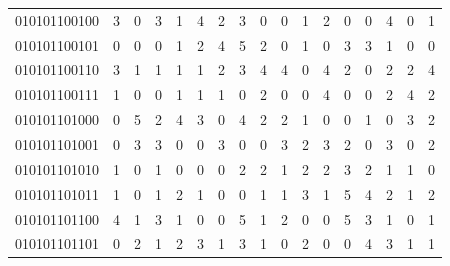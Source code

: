 \documentclass[10pt,a4paper]{article}
\begin{document}
\begin{longtable}{ |c|c|c|c|c|c|c|c|c|c|c|c|c|c|c|c|c| }
    010101100100              & 3                            & 0                                & 3                            & 1                              & 4   & 2   & 3   & 0   & 0   & 1   & 2   & 0   & 0   & 4   & 0   & 1   \\
    010101100101              & 0                            & 0                                & 0                            & 1                              & 2   & 4   & 5   & 2   & 0   & 1   & 0   & 3   & 3   & 1   & 0   & 0   \\
    010101100110              & 3                            & 1                                & 1                            & 1                              & 1   & 2   & 3   & 4   & 4   & 0   & 4   & 2   & 0   & 2   & 2   & 4   \\
    010101100111              & 1                            & 0                                & 0                            & 1                              & 1   & 1   & 0   & 2   & 0   & 0   & 4   & 0   & 0   & 2   & 4   & 2   \\
    010101101000              & 0                            & 5                                & 2                            & 4                              & 3   & 0   & 4   & 2   & 2   & 1   & 0   & 0   & 1   & 0   & 3   & 2   \\
    010101101001              & 0                            & 3                                & 3                            & 0                              & 0   & 3   & 0   & 0   & 3   & 2   & 3   & 2   & 0   & 3   & 0   & 2   \\
    010101101010              & 1                            & 0                                & 1                            & 0                              & 0   & 0   & 2   & 2   & 1   & 2   & 2   & 3   & 2   & 1   & 1   & 0   \\
    010101101011              & 1                            & 0                                & 1                            & 2                              & 1   & 0   & 0   & 1   & 1   & 3   & 1   & 5   & 4   & 2   & 1   & 2   \\
    010101101100              & 4                            & 1                                & 3                            & 1                              & 0   & 0   & 5   & 1   & 2   & 0   & 0   & 5   & 3   & 1   & 0   & 1   \\
    010101101101              & 0                            & 2                                & 1                            & 2                              & 3   & 1   & 3   & 1   & 0   & 2   & 0   & 0   & 4   & 3   & 1   & 1   \\

\end{longtable}
\end{document}
